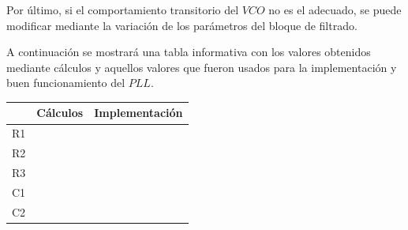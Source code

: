 \documentclass[twocolumn]{article}
\begin{document}
Por último, si el comportamiento transitorio del $VCO$ no es el adecuado, se puede modificar mediante la variación de los parámetros del bloque de filtrado.

A continuación se mostrará una tabla informativa con los valores obtenidos mediante cálculos y aquellos valores que fueron usados para la implementación y buen funcionamiento del $PLL$.

\begin{table}[H]
\centering
\begin{tabular}{|l|l|l|}
\hline
						 & Cálculos & Implementación \\ \hline
R1                       &          &                \\ \hline
R2                       &          &                \\ \hline
R3                       &          &                \\ \hline
C1                       &          &                \\ \hline
C2                       &          &                \\ \hline
\end{tabular}
\end{table}
\end{document}
